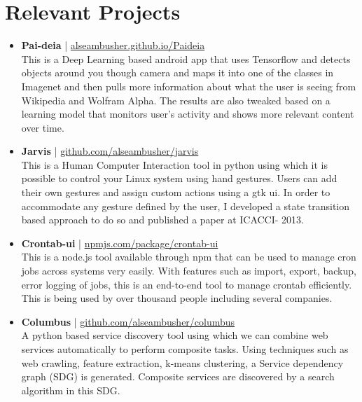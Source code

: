 \documentclass{article} %
\begin{document}
\section{Relevant Projects}
\begin{itemize}
 \item \textbf{Pai-deia} | \href{http://alseambusher.github.io/Paideia}{alseambusher.github.io/Paideia}\\ 
 This is a Deep Learning based android app that uses Tensorflow and detects objects around you though camera and maps it into one of the classes in Imagenet and then pulls more information about what the user is seeing from Wikipedia and Wolfram Alpha. The results are also tweaked based on a learning model that monitors user's activity and shows more relevant content over time.
 
 \item \textbf{Jarvis} | \href{http://github.com/alseambusher/jarvis}{github.com/alseambusher/jarvis}\\ 
 This is a Human Computer Interaction tool in python using which it is possible to control your Linux system using hand gestures. Users can add their own gestures and assign custom actions using a gtk ui. In order to accommodate any gesture defined by the user, I developed a state transition based approach to do so and published a paper at ICACCI- 2013. 
 
 \item \textbf{Crontab-ui} | \href{http://npmjs.com/package/crontab-ui}{npmjs.com/package/crontab-ui}\\
 This is a node.js tool available through npm that can be used to manage cron jobs across systems very easily. With features such as import, export, backup, error logging of jobs, this is an end-to-end tool to manage crontab efficiently. This is being used by over thousand people including several companies.
 
 \item \textbf{Columbus} | \href{http://github.com/alseambusher/columbus}{github.com/alseambusher/columbus}\\
 A python based service discovery tool using which we can combine web services automatically to perform composite tasks. Using techniques such as web crawling, feature extraction, k-means clustering, a Service dependency graph (SDG) is generated. Composite services are discovered by a search algorithm in this SDG.
 

\end{itemize}
\end{document}
